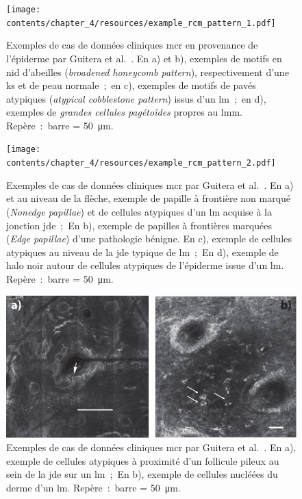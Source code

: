 \begin{figure}[p]
    \begin{center}
        \texttt{[image: contents/chapter\_4/resources/example\_rcm\_pattern\_1.pdf]}
        \caption{Exemples de cas de données cliniques \gls{mcr} en provenance de l'épiderme par Guitera et al.~\cite{Guitera2010}. En a) et b), exemples de motifs en nid d'abeilles (\textit{broadened honeycomb pattern}), respectivement d'une \gls{ks} et de peau normale~;~en c), exemples de motifs de pavés atypiques (\textit{atypical cobblestone pattern}) issus d'un \gls{lm}~;~en d), exemples de \textit{grandes cellules pagétoïdes} propres au \gls{lmm}. Repère~:~barre = \SI{50}{\micro\metre}.}
        \label{fig:example_rcm_pattern_1}
    \end{center} 
\end{figure}\par

\begin{figure}[p]
    \begin{center}
        \texttt{[image: contents/chapter\_4/resources/example\_rcm\_pattern\_2.pdf]}
        \caption{Exemples de cas de données cliniques \gls{mcr} par Guitera et al.~\cite{Guitera2010}. En a) et au niveau de la flèche, exemple de papille à frontière non marqué (\textit{Nonedge papillae}) et de cellules atypiques d'un \gls{lm} acquise à la jonction \gls{jde}~;~En b), exemple de papilles à frontières marquées (\textit{Edge papillae}) d'une pathologie bénigne. En c), exemple de cellules atypiques au niveau de la \gls{jde} typique de \gls{lm}~;~En d), exemple de halo noir autour de cellules atypiques de l'épiderme issue d'un \gls{lm}. Repère~:~barre = \SI{50}{\micro\metre}.}
        \label{fig:example_rcm_pattern_2}
    \end{center} 
\end{figure}\par

\begin{figure}[H]
    \begin{center}
        \includegraphics[width=\linewidth]{contents/chapter_4/resources/example_rcm_pattern_3.pdf}
        \caption{Exemples de cas de données cliniques \gls{mcr} par Guitera et al.~\cite{Guitera2010}. En a), exemple de cellules atypiques à proximité d'un follicule pileux au sein de la \gls{jde} sur un \gls{lm}~;~En b), exemple de cellules nucléées du derme d'un \gls{lm}. Repère~:~barre = \SI{50}{\micro\metre}.}
        \label{fig:example_rcm_pattern_3}
    \end{center} 
\end{figure}\par


